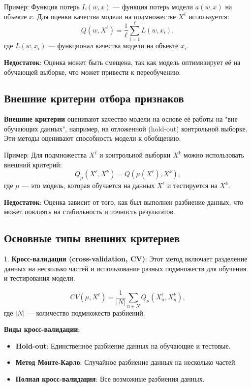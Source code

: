 Пример:
Функция потерь \( L(w, x) \) — функция потерь модели \( a(w, x) \) на объекте \( x \). Для оценки качества модели на подмножестве \( X^\ell \) используется:
\[
    Q(w, X^\ell) = \frac{1}{\ell} \sum_{i=1}^{\ell} L(w, x_i),
\]
где \( L(w, x_i) \) — функционал качества модели на объекте \( x_i \).

\textbf{Недостаток}: Оценка может быть смещена, так как модель оптимизирует её на обучающей выборке, что может привести к переобучению.

\subsection{Внешние критерии отбора признаков}

\textbf{Внешние критерии} оценивают качество модели на основе её работы на "вне обучающих данных", например, на отложенной (hold-out) контрольной выборке. Эти методы оценивают способность модели к обобщению.

Пример:
Для подмножества \( X^\ell \) и контрольной выборки \( X^k \) можно использовать внешний критерий:
\[
    Q_\mu(X^\ell, X^k) = Q(\mu(X^\ell), X^k),
\]
где \( \mu \) — это модель, которая обучается на данных \( X^\ell \) и тестируется на \( X^k \).

\textbf{Недостаток}: Оценка зависит от того, как был выполнен разбиение данных, что может повлиять на стабильность и точность результатов.
\subsection{Основные типы внешних критериев}

1. \textbf{Кросс-валидация (cross-validation, CV)}: Этот метод включает разделение данных на несколько частей и использование разных подмножеств для обучения и тестирования модели.

\[
    CV(\mu, X^\ell) = \frac{1}{|N|} \sum_{n \in N} Q_\mu(X^\ell_n, X^k_n),
\]
где \( |N| \) — количество подмножеств разбиений.

\textbf{Виды кросс-валидации}:
\begin{itemize}
    \item \textbf{Hold-out}: Единственное разбиение данных на обучающие и тестовые.
    \item \textbf{Метод Монте-Карло}: Случайное разбиение данных на несколько частей.
    \item \textbf{Полная кросс-валидация}: Все возможные разбиения данных.
\end{itemize}

